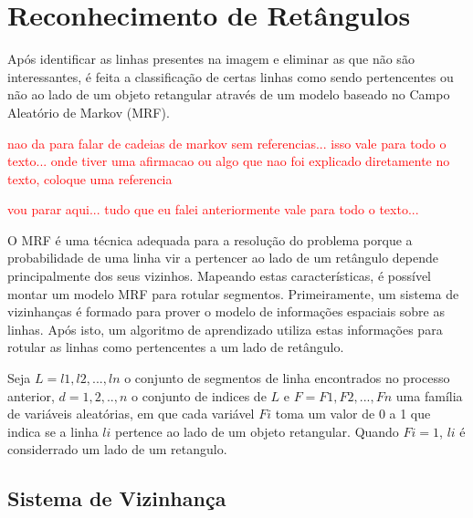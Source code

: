 

\section{Reconhecimento de Retângulos}

Após identificar as linhas presentes na imagem e eliminar as que não são interessantes, é feita a classificação de certas linhas como sendo pertencentes ou não ao lado de um objeto retangular através de um modelo baseado no Campo Aleatório de Markov (MRF).

\textcolor{red}{nao da para falar de cadeias de markov sem referencias... isso vale para todo o texto... onde tiver uma afirmacao ou algo que nao foi explicado diretamente no texto, coloque uma referencia}

\textcolor{red}{vou parar aqui... tudo que eu falei anteriormente vale para todo o texto...}

O MRF é uma técnica adequada para a resolução do problema porque a probabilidade de uma linha vir a pertencer ao lado de um retângulo depende principalmente dos seus vizinhos. Mapeando estas características, é possível montar um modelo MRF para rotular segmentos. Primeiramente, um sistema de vizinhanças é formado para prover o modelo de informações espaciais sobre as linhas. Após isto, um algoritmo de aprendizado utiliza estas informações para rotular as linhas como pertencentes a um lado de retângulo.

Seja $L = {l1,l2,...,ln}$ o conjunto de segmentos de linha encontrados no processo anterior, $d = {1,2,..,n}$ o conjunto de indices de $L$ e $F = {F1,F2,...,Fn}$ uma família de variáveis aleatórias, em que cada variável $Fi$ toma um valor de 0 a 1 que indica se a linha $li$ pertence ao lado de um objeto retangular. Quando $Fi = 1$, $li$ é considerrado um lado de um retangulo.

\subsection{Sistema de Vizinhança}


